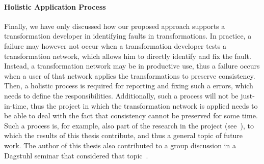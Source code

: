\paragraph{Holistic Application Process}
Finally, we have only discussed how our proposed approach supports a transformation developer in identifying faults in transformations.
In practice, a failure may however not occur when a transformation developer tests a transformation network, which allows him to directly identify and fix the fault.
Instead, a transformation network may be in productive use, thus a failure occurs when a user of that network applies the transformations to preserve consistency.
Then, a holistic process is required for reporting and fixing such a errors, which needs to define the responsibilities.
Additionally, such a process will not be just-in-time, thus the project in which the transformation network is applied needs to be able to deal with the fact that consistency cannot be preserved for some time.
Such a process is, for example, also part of the research in the \vitruv project (see~\cite{klare2020Vitruv-JSS}), to which the results of this thesis contribute, and thus a general topic of future work.
The author of this thesis also contributed to a group discussion in a Dagstuhl seminar that considered that topic~.





